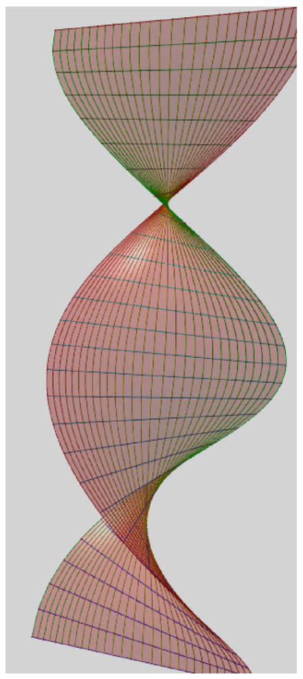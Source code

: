 \documentclass {report}
\begin{document}
\begin{figure}[h!]
      \centering 
      \includegraphics[scale=0.3]{Images_Fichiers/13.eps}
\end{figure}
\end{document}
